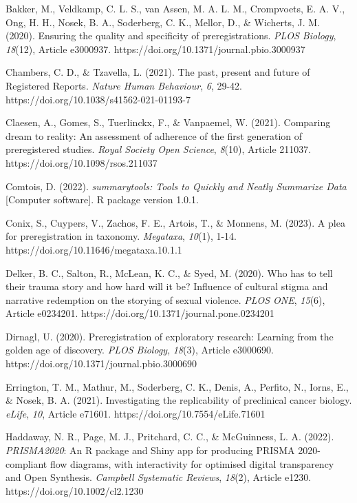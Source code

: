 \documentclass[authordate, empirical]{jote-new-article}
\begin{document}
	Bakker, M., Veldkamp, C. L. S., van Assen, M. A. L. M., Crompvoets, E. A. V., Ong, H. H., Nosek, B. A., Soderberg, C. K., Mellor, D., \& Wicherts, J. M. (2020). Ensuring the quality and specificity of preregistrations. \emph{PLOS Biology}, \emph{18}(12), Article e3000937. https://doi.org/10.1371/journal.pbio.3000937



	Chambers, C. D., \& Tzavella, L. (2021). The past, present and future of Registered Reports. \emph{Nature Human Behaviour}, \emph{6}, 29-42. https://doi.org/10.1038/s41562-021-01193-7



	Claesen, A., Gomes, S., Tuerlinckx, F., \& Vanpaemel, W. (2021). Comparing dream to reality: An assessment of adherence of the first generation of preregistered studies. \emph{Royal Society Open Science}, \emph{8}(10), Article 211037. https://doi.org/10.1098/rsos.211037



	Comtois, D. (2022). \emph{summarytools: Tools to Quickly and Neatly Summarize Data} [Computer software]. R package version 1.0.1.



	Conix, S., Cuypers, V., Zachos, F. E., Artois, T., \& Monnens, M. (2023). A plea for preregistration in taxonomy. \emph{Megataxa}, \emph{10}(1), 1-14. https://doi.org/10.11646/megataxa.10.1.1



	Delker, B. C., Salton, R., McLean, K. C., \& Syed, M. (2020). Who has to tell their trauma story and how hard will it be? Influence of cultural stigma and narrative redemption on the storying of sexual violence. \emph{PLOS ONE}, \emph{15}(6), Article e0234201. https://doi.org/10.1371/journal.pone.0234201



	Dirnagl, U. (2020). Preregistration of exploratory research: Learning from the golden age of discovery. \emph{PLOS Biology}, \emph{18}(3), Article e3000690. https://doi.org/10.1371/journal.pbio.3000690



	Errington, T. M., Mathur, M., Soderberg, C. K., Denis, A., Perfito, N., Iorns, E., \& Nosek, B. A. (2021). Investigating the replicability of preclinical cancer biology. \emph{eLife}, \emph{10}, Article e71601. https://doi.org/10.7554/eLife.71601



	Haddaway, N. R., Page, M. J., Pritchard, C. C., \& McGuinness, L. A. (2022). \emph{PRISMA2020}: An R package and Shiny app for producing PRISMA 2020-compliant flow diagrams, with interactivity for optimised digital transparency and Open Synthesis. \emph{Campbell Systematic Reviews}, \emph{18}(2), Article e1230. https://doi.org/10.1002/cl2.1230
\end{document}
